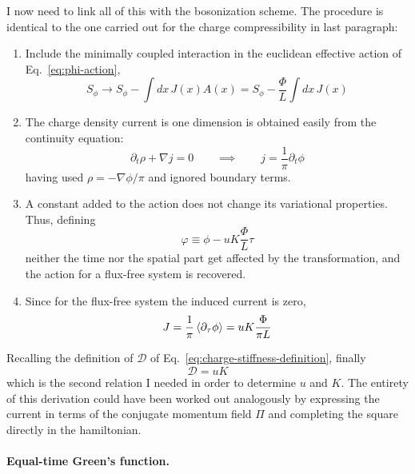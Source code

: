 I now need to link all of this with the bosonization scheme. The procedure is identical to the one carried out for the charge compressibility in last paragraph:
\begin{enumerate}
	\item Include the minimally coupled interaction in the euclidean effective action of Eq.~\eqref{eq:phi-action},
	\[
		S_\phi \to S_\phi - \int dx \, J(x) A(x) = S_\phi - \frac{\Phi}{L} \int dx \, J(x)
	\]
	\item The charge density current is one dimension is obtained easily from the continuity equation:
	\[
		\partial_t \rho + \nabla j = 0
		\qquad\implies\qquad
		j = \frac{1}{\pi} \partial_t \phi
	\]
	having used $\rho = - \nabla \phi/\pi$ and ignored boundary terms.
	\item A constant added to the action does not change its variational properties. Thus, defining
	\[
		\varphi \equiv \phi - uK \frac{\Phi}{L} \tau
	\]
	neither the time nor the spatial part get affected by the transformation, and the action for a flux-free system is recovered.
	\item Since for the flux-free system the induced current is zero,
	\[
		J = \frac{1}{\pi} \ev{\partial_\tau \phi} = uK \frac{\Phi}{\pi L}
	\]
\end{enumerate}
Recalling the definition of $\mathcal{D}$ of Eq.~\eqref{eq:charge-stiffness-definition}, finally
\begin{equation}\label{eq:charge-stiffness}
	\mathcal{D} = uK
\end{equation}
which is the second relation I needed in order to determine $u$ and $K$. The entirety of this derivation could have been worked out analogously by expressing the current in terms of the conjugate momentum field $\Pi$ and completing the square directly in the hamiltonian.

\paragraph{Equal-time Green's function.}

